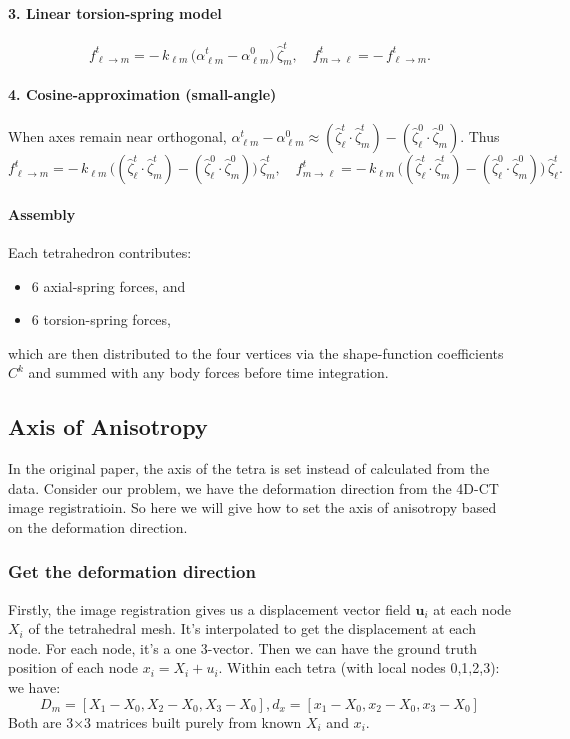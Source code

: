 \documentclass{article}
\begin{document}
\paragraph{3. Linear torsion-spring model}
\begin{equation}
\boxed{
f^t_{\ell\to m} = -\,k_{\ell m}\,\bigl(\alpha^t_{\ell m}-\alpha^0_{\ell m}\bigr)\,\hat\zeta_m^t,
}
\quad
f^t_{m\to \ell}=-\,f^t_{\ell\to m}.
\tag{2.40–2.41}
\label{eq:linear_torsion}
\end{equation}

\paragraph{4. Cosine-approximation (small-angle)}
When axes remain near orthogonal, $\alpha^t_{\ell m}-\alpha^0_{\ell m} \approx (\hat\zeta_\ell^t\!\cdot\!\hat\zeta_m^t) - (\hat\zeta_\ell^0\!\cdot\!\hat\zeta_m^0)$. Thus
\begin{equation}
\boxed{
f^t_{\ell\to m} = -\,k_{\ell m}\,\bigl((\hat\zeta_\ell^t\!\cdot\!\hat\zeta_m^t) - (\hat\zeta_\ell^0\!\cdot\!\hat\zeta_m^0)\bigr)\,\hat\zeta_m^t,
}
\quad
f^t_{m\to \ell} = -\,k_{\ell m}\,\bigl((\hat\zeta_\ell^t\!\cdot\!\hat\zeta_m^t) - (\hat\zeta_\ell^0\!\cdot\!\hat\zeta_m^0)\bigr)\,\hat\zeta_\ell^t.
\tag{2.44–2.45}
\label{eq:cosine_torsion}
\end{equation}

\paragraph{Assembly} Each tetrahedron contributes:
\begin{itemize}
    \item 6 axial-spring forces, and
    \item 6 torsion-spring forces,
\end{itemize}
which are then distributed to the four vertices via the shape-function coefficients $C^k$ and summed with any body forces before time integration.

\subsection{Axis of Anisotropy}
In the original paper, the axis of the tetra is set instead of calculated from the data. 
Consider our problem, we have the deformation direction from the 4D-CT image registratioin.
So here we will give how to set the axis of anisotropy based on the deformation direction.

\subsubsection{Get the deformation direction}
Firstly, the image registration gives us a displacement vector field $\mathbf{u}_i$ at each node 
$X_i$ of the tetrahedral mesh. It's interpolated to get the displacement at each node. 
For each node, it's a one 3-vector. Then we can have the ground truth position of each node $x_i = X_i + u_i$. 
Within each tetra (with local nodes 0,1,2,3): we have: 
$$D_m = [ X_1-X_0 ,  X_2-X_0 ,  X_3-X_0], 
d_x = [ x_1-X_0 ,  x_2-X_0 ,  x_3-X_0]$$
Both are 3×3 matrices built purely from known $X_i$ and $x_i$.
\end{document}
